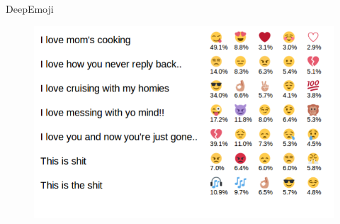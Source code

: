 \documentclass[handout]{beamer}
\begin{document}
%
%
%
%
%









\begin{frame}{DeepEmoji}
  \begin{figure}[h]
        	\includegraphics[scale = 0.45]{pics/deepEmoji1.png}
        \end{figure}    
        
\end{frame}
\end{document}
